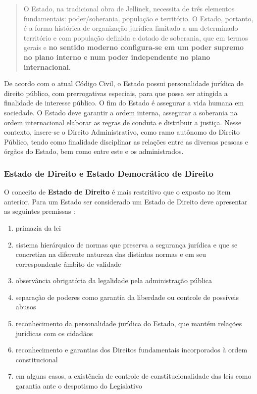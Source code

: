 \documentclass[]{article}
\providecommand{\tightlist}{%
  \setlength{\itemsep}{0pt}\setlength{\parskip}{0pt}}
\begin{document}
\begin{quote}
O Estado, na tradicional obra de Jellinek, necessita de três elementos
fundamentais: poder/soberania, população e território. O Estado,
portanto, é a forma histórica de organização jurídica limitado a um
determinado território e com população definida e dotado de soberania,
que em termos gerais e \textbf{no sentido moderno configura-se em um
poder supremo no plano interno e num poder independente no plano
internacional}.
\end{quote}

De acordo com o atual Código Civil, o Estado possui personalidade
jurídica de direito público, com prerrogativas especiais, para que possa
ser atingida a finalidade de interesse público. O fim do Estado é
assegurar a vida humana em sociedade. O Estado deve garantir a ordem
interna, assegurar a soberania na ordem internacional elaborar as regras
de conduta e distribuir a justiça. Nesse contexto, insere-se o Direito
Administrativo, como ramo autônomo do Direito Público, tendo como
finalidade disciplinar as relações entre as diversas pessoas e órgãos do
Estado, bem como entre este e os administrados.

\subsubsection{Estado de Direito e Estado Democrático de
Direito}\label{estado-de-direito-e-estado-democratico-de-direito}

O conceito de \textbf{Estado de Direito} é mais restritivo que o exposto
no item anterior. Para um Estado ser considerado um Estado de Direito
deve apresentar as seguintes premissas \cite[p.~5]{moraes}:

\begin{enumerate}
\def\labelenumi{\arabic{enumi}.}
\tightlist
\item
  primazia da lei
\item
  sistema hierárquico de normas que preserva a segurança jurídica e que
  se concretiza na diferente natureza das distintas normas e em seu
  correspondente âmbito de validade
\item
  observância obrigatória da legalidade pela administração pública
\item
  separação de poderes como garantia da liberdade ou controle de
  possíveis abusos
\item
  reconhecimento da personalidade jurídica do Estado, que mantém
  relações jurídicas com os cidadãos
\item
  reconhecimento e garantias dos Direitos fundamentais incorporados à
  ordem constitucional
\item
  em alguns casos, a existência de controle de constitucionalidade das
  leis como garantia ante o despotismo do Legislativo
\end{enumerate}
\end{document}

